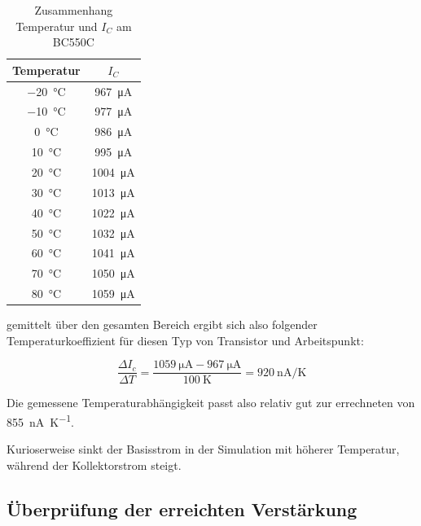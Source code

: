 \begin{table}[H]
    \centering
    \begin{tabular}{|c|c|}
    \hline
         Temperatur & $I_{C}$  \\ \hline \hline
         \SI{-20}{\celsius}& \SI{967}{\micro \ampere} \\ \hline
         \SI{-10}{\celsius}& \SI{977}{\micro \ampere} \\ \hline
         \SI{0}{\celsius}& \SI{986}{\micro \ampere} \\ \hline
         \SI{10}{\celsius}& \SI{995}{\micro \ampere} \\ \hline
         \SI{20}{\celsius}& \SI{1004}{\micro \ampere} \\ \hline
         \SI{30}{\celsius}& \SI{1013}{\micro \ampere} \\ \hline
         \SI{40}{\celsius}& \SI{1022}{\micro \ampere} \\ \hline
         \SI{50}{\celsius}& \SI{1032}{\micro \ampere} \\ \hline
         \SI{60}{\celsius}& \SI{1041}{\micro \ampere} \\ \hline
         \SI{70}{\celsius}& \SI{1050}{\micro \ampere} \\ \hline
         \SI{80}{\celsius}& \SI{1059}{\micro \ampere} \\ \hline
    \end{tabular}
    \caption{Zusammenhang Temperatur und $I_{C}$ am BC550C}
    \label{tab:my_label}
\end{table}

gemittelt über den gesamten Bereich ergibt sich also folgender Temperaturkoeffizient für diesen Typ von Transistor und Arbeitspunkt:

\begin{equation*}
    \frac{\Delta I_{c}}{\Delta T} = \frac{\SI{1059}{\micro \ampere} - \SI{967}{\micro \ampere}}{\SI{100}{\kelvin}} = \SI{920}{\nano \ampere \per \kelvin}
\end{equation*}

Die \glqq gemessene \grqq{} Temperaturabhängigkeit passt also relativ gut zur errechneten von \SI{855}{\nano \ampere \per \kelvin}.

Kurioserweise sinkt der Basisstrom in der Simulation mit höherer Temperatur, während der Kollektorstrom steigt.

\subsection{Überprüfung der erreichten Verstärkung}

